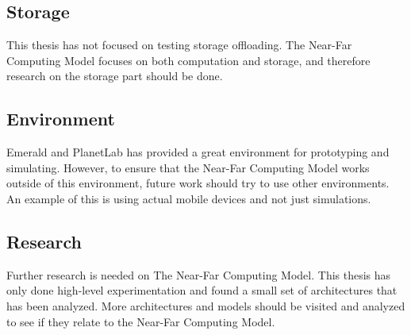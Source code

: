 \subsection{Storage}
This thesis has not focused on testing storage offloading. The Near-Far Computing Model focuses on both computation and storage, and therefore research on the storage part should be done. 

\subsection{Environment}
Emerald and PlanetLab has provided a great environment for prototyping and simulating. However, to ensure that the Near-Far Computing Model works outside of this environment, future work should try to use other environments. An example of this is using actual mobile devices and not just simulations.

\subsection{Research}
Further research is needed on The Near-Far Computing Model. This thesis has only done high-level experimentation and found a small set of architectures that has been analyzed. More architectures and models should be visited and analyzed to see if they relate to the Near-Far Computing Model.

